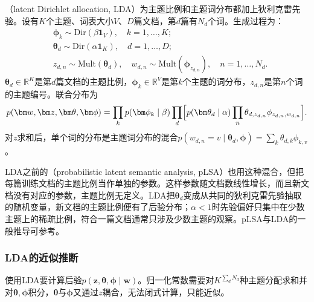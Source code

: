 （latent Dirichlet allocation, LDA）为主题比例和主题词分布都加上狄利克雷先验。设有$K$个主题、词表大小$V$、$D$篇文档，第$d$篇有$N_d$个词。生成过程为：
\begin{equation}
  \begin{aligned}
    &\bm\phi_k\sim\mathrm{Dir}(\beta\bm 1_V),\quad k=1,\ldots,K;\\
    &\bm\theta_d\sim\mathrm{Dir}(\alpha\bm 1_K),\quad d=1,\ldots,D;\\
    &z_{d,n}\sim\mathrm{Mult}(\bm\theta_d),\quad w_{d,n}\sim\mathrm{Mult}(\bm\phi_{z_{d,n}}),\quad n=1,\ldots,N_d.
  \end{aligned}
  \label{eq:nlp-classical-lda}
\end{equation}
$\bm\theta_d\in\mathbb R^K$是第$d$篇文档的主题比例，$\bm\phi_k\in\mathbb R^V$是第$k$个主题的词分布，$z_{d,n}$是第$n$个词的主题编号。联合分布为
\[
  p(\bm w,\bm z,\bm\theta,\bm\phi)=\prod_k p(\bm\phi_k\mid\beta)\prod_d\Bigl[p(\bm\theta_d\mid\alpha)\prod_{n}\theta_{d,z_{d,n}}\phi_{z_{d,n},w_{d,n}}\Bigr].
\]
对$z$求和后，单个词的分布是主题词分布的混合$p(w_{d,n}=v\mid\bm\theta_d,\bm\phi)=\sum_k\theta_{d,k}\phi_{k,v}$。

LDA之前的（probabilistic latent semantic analysis, pLSA）也用这种混合，但把每篇训练文档的主题比例当作单独的参数。这样参数随文档数线性增长，而且新文档没有对应的参数，主题比例无定义。LDA把$\bm\theta_d$变成从共同的狄利克雷先验抽取的随机变量，新文档的主题比例便有了后验分布；$\alpha<1$时先验偏好只集中在少数主题上的稀疏比例，符合一篇文档通常只涉及少数主题的观察。pLSA与LDA的一般推导可参考。

\subsubsection{LDA的近似推断}
\label{sec:nlp-classical-lda-inference}

使用LDA要计算后验$p(\bm z,\bm\theta,\bm\phi\mid\bm w)$。归一化常数需要对$K^{\sum_dN_d}$种主题分配求和并对$\bm\theta,\bm\phi$积分，$\bm\theta$与$\bm\phi$又通过$z$耦合，无法闭式计算，只能近似。

